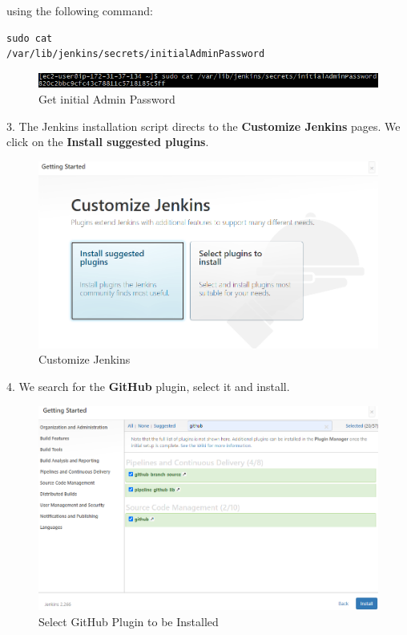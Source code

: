 \documentclass[12pt,a4paper,twoside]{article}
\begin{document}
using the following command:


\begin{verbatim}
sudo cat
/var/lib/jenkins/secrets/initialAdminPassword
\end{verbatim}


\begin{figure}[H]
    \centering
        \includegraphics[width=13cm]{images-aws/21-get-jenkins-admin-pass.png}
        \caption{Get initial Admin Password}
\end{figure}


3. The Jenkins installation script directs to the \textbf{Customize Jenkins} pages. We click on the  \textbf{Install suggested plugins}.


\begin{figure}[H]
    \centering
        \includegraphics[width=15cm]{images-aws/22-jenkins-select-plugin.png}
        \caption{Customize Jenkins}
\end{figure}


4. We search for the \textbf{GitHub} plugin, select it and install.


\begin{figure}[H]
    \centering
        \includegraphics[width=15cm]{images-aws/23-jenkins-select-github-plugin.png}
        \caption{Select GitHub Plugin to be Installed}
\end{figure}
\end{document}
